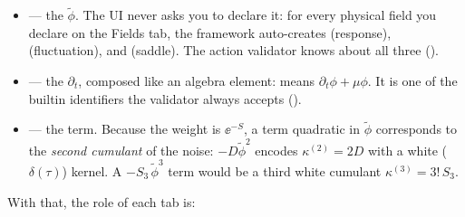 \begin{itemize}
  \item {} --- the  $\tilde\phi$. The UI never asks
        you to declare it: for every physical field  you declare on the
        Fields tab, the framework auto-creates  (response),
         (fluctuation), and  (saddle). The action
        validator knows about all three ().
  \item {} --- the  $\partial_t$, composed
        like an algebra element:  means
        $\partial_t\phi + \mu\phi$. It is one of the builtin identifiers the
        validator always accepts ().
  \item {} --- the  term. Because the
        weight is $\ee^{-S}$, a term quadratic in $\tilde\phi$ corresponds to the
        \emph{second cumulant} of the noise: $-D\tilde\phi^{2}$ encodes
        $\kappa^{(2)} = 2D$ with a white ($\delta(\tau)$) kernel. A
        $-S_3\,\tilde\phi^{3}$ term would be a third white cumulant
        $\kappa^{(3)} = 3!\,S_3$.
\end{itemize}

With that, the role of each tab is:

